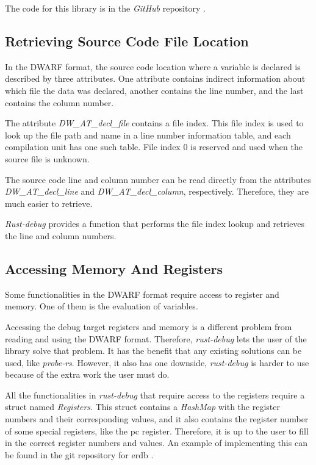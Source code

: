 The code for this library is in the \emph{GitHub} repository \cite{rust-debug}.



\subsection{Retrieving Source Code File Location} \label{sec:decl}
In the \gls{DWARF} format, the source code location where a variable is declared is described by three attributes.
One attribute contains indirect information about which file the data was declared, another contains the line number, and the last contains the column number.


The attribute \emph{DW\_AT\_decl\_file} contains a file index.
This file index is used to look up the file path and name in a line number information table, and each compilation unit has one such table.
File index $0$ is reserved and used when the source file is unknown.


The source code line and column number can be read directly from the attributes \emph{DW\_AT\_decl\_line} and \emph{DW\_AT\_decl\_column}, respectively.
Therefore, they are much easier to retrieve.


\emph{Rust-debug} provides a function that performs the file index lookup and retrieves the line and column numbers.



\subsection{Accessing Memory And Registers}
Some functionalities in the \gls{DWARF} format require access to register and memory.
One of them is the evaluation of variables.


Accessing the debug target registers and memory is a different problem from reading and using the \gls{DWARF} format.
Therefore, \emph{rust-debug} lets the user of the library solve that problem.
It has the benefit that any existing solutions can be used, like \emph{probe-rs}.
However, it also has one downside, \emph{rust-debug} is harder to use because of the extra work the user must do.


All the functionalities in \emph{rust-debug} that require access to the registers require a struct named \emph{Registers}.
This struct contains a \emph{HashMap} with the register numbers and their corresponding values, and it also contains the register number of some special registers, like the \gls{pc} register.
Therefore, it is up to the user to fill in the correct register numbers and values.
An example of implementing this can be found in the git repository for \gls{erdb} \cite{erdb}.


